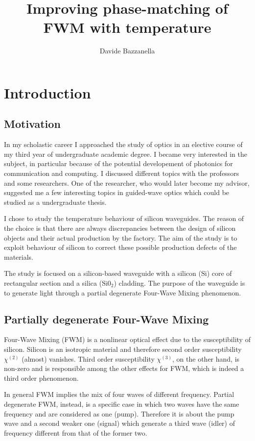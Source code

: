 \documentclass[12pt,a4paper,twoside]{article}
\author{Davide Bazzanella}
\title{Improving phase-matching of FWM with temperature}
\begin{document}

\cleardoublepage 
\setcounter{page}{3}
\tableofcontents

\cleardoublepage
{}

\section{Introduction}
\subsection{Motivation}
In my scholastic career I approached the study of optics in an elective course of my third year of undergraduate academic degree.
I became very interested in the subject, in particular because of the potential developement of photonics for communication and computing.
I discussed different topics with the professors and some researchers.
One of the researcher, who would later become my advisor, suggested me a few interesting topics in guided-wave optics which could be studied as a undergraduate thesis.

I chose to study the temperature behaviour of silicon waveguides.
The reason of the choice is that there are always discrepancies between the design of silicon objects and their actual production by the factory.
The aim of the study is to exploit behaviour of silicon to correct these possible production defects of the materials.

The study is focused on a silicon-based waveguide with a silicon ($\mathrm{Si}$) core of rectangular section and a silica ($\mathrm{Si0}_2$) cladding.
The purpose of the waveguide is to generate light through a partial degenerate Four-Wave Mixing phenomenon.

\subsection{Partially degenerate Four-Wave Mixing}
Four-Wave Mixing (FWM) is a nonlinear optical effect due to the susceptibility of silicon.
Silicon is an isotropic material and therefore second order susceptibility $\chi^{(2)}$ (almost) vanishes.
Third order susceptibility $\chi^{(3)}$, on the other hand, is non-zero and is responsible among the other effects for FWM, which is indeed a third order phenomenon.

In general FWM implies the mix of four waves of different frequency.
Partial degenerate FWM, instead, is a specific case in which two waves have the same frequency and are considered as one (pump).
Therefore it is about the pump wave and a second weaker one (signal) which generate a third wave (idler) of frequency different from that of the former two.
\end{document}
